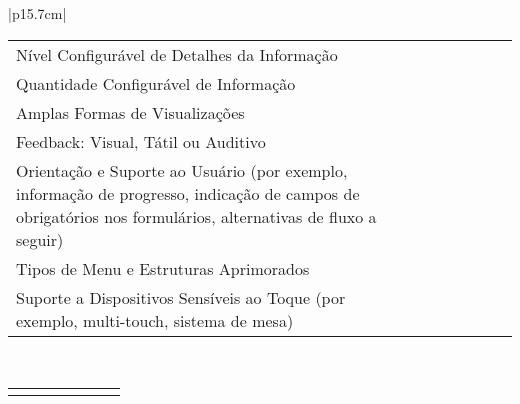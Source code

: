 \begin{longtable}{|p{15.7cm}|}
\begin{tabularx}{15.7 cm}{|X|X|X|X|X|X|X|}
		& {\rotatebox[origin=c]{90}{\parbox[c]{2.5cm}{\centering \textcolor{white}{.}\newline \medskip Concordo Parcialmente}}} 
		& {\rotatebox[origin=c]{90}{\parbox[c]{2.5cm}{\centering \textcolor{white}{.}\newline \medskip Não Concordo \newline Nem Discordo}}}	 
		& {\rotatebox[origin=c]{90}{\parbox[c]{2.5cm}{\centering \textcolor{white}{.}\newline \medskip Discordo  Parcialmente }}} 
		& {\rotatebox[origin=c]{90}{\parbox[c]{2.5cm}{\centering \textcolor{white}{.}\newline \medskip Discordo  Completamente  }}}
		& {\rotatebox[origin=c]{90}{\parbox[c]{2.5cm}{\centering \textcolor{white}{.}\newline  \textcolor{white}{.}\newline Eu Não Sei }}} \\
		\hline
		Nível Configurável de Detalhes da Informação &   &   &   &   &   &  \\
		\hline
		Quantidade Configurável de Informação &   &   &   &   &   &  \\
		\hline
		Amplas Formas de Visualizações &   &   &   &   &   &  \\
		\hline
		Feedback: Visual, Tátil ou Auditivo &   &   &   &   &   &  \\
		\hline
		Orientação e Suporte ao Usuário (por exemplo, informação de progresso, indicação de campos de obrigatórios nos formulários, alternativas de fluxo a seguir)  &   &   &   &   &   &  \\
		\hline
		Tipos de Menu e Estruturas Aprimorados &   &   &   &   &   &  \\
		\hline
		Suporte a Dispositivos Sensíveis ao Toque (por exemplo, multi-touch, sistema de mesa) &   &   &   &   &   &  \\
		\hline
	\end{tabularx}\\
	\tiny \begin{tabularx}{15.7 cm}{|X|X|X|X|X|X|X|}
		\hline
		& {\rotatebox[origin=c]{90}{\parbox[c]{2.5cm}{\centering \textcolor{white}{.}\newline \medskip Concordo Completamente}}} 
		& {\rotatebox[origin=c]{90}{\parbox[c]{2.5cm}{\centering \textcolor{white}{.}\newline \medskip Concordo Parcialmente}}} 
		& {\rotatebox[origin=c]{90}{\parbox[c]{2.5cm}{\centering \textcolor{white}{.}\newline \medskip Não Concordo \newline Nem Discordo}}}	 

\end{tabularx}
\end{longtable}
